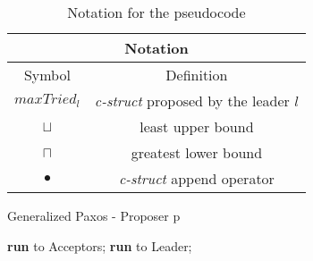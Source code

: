 \begin{table}[h!]
	\renewcommand{\arraystretch}{1.5}
	\centering
	\begin{tabular}{ |c|c|}
		\hline
		\multicolumn{2}{|c|}{Notation}\\
		\hline
		Symbol & Definition \\
		\hline
		$maxTried_l$  & \textit{c-struct} proposed by the leader $l$ \\
		\hline
		$\sqcup$ & least upper bound \\
		\hline
		$\sqcap$ & greatest lower bound \\
		\hline
		$\bullet$ & \textit{c-struct} append operator \\
		\hline
	\end{tabular} 
	\caption{Notation for the pseudocode} 
	\label{table:1}
\end{table}

\begin{algorithm}
	\caption{Generalized Paxos - Proposer p}
	\begin{algorithmic}[1]
		
		\State \textbf{run}  to Acceptors;
		\Else
		\State \textbf{run}  to Leader;
		\EndIf
		\EndFunction
		
		
	\end{algorithmic}
\end{algorithm}

